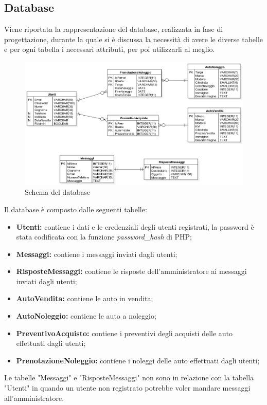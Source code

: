     \subsection{Database}
    Viene riportata la rappresentazione del database, realizzata in fase di progettazione, durante la quale si è discussa la necessità di avere le diverse tabelle e per ogni tabella i necessari attributi, per poi utilizzarli al meglio.
    \begin{figure}[H]
        \centering
        \includegraphics[width=14cm]{./img/database.png}
        \caption{Schema del database}  \label{fig:xray}
    \end{figure}
    Il database è composto dalle seguenti tabelle:
    \begin{itemize}
        \item \textbf{Utenti:} contiene i dati e le credenziali degli utenti registrati, la password è stata codificata con la funzione \textit{password\_hash} di PHP;
        \item \textbf{Messaggi:} contiene i messaggi inviati dagli utenti;
        \item \textbf{RisposteMessaggi:} contiene le risposte dell'amministratore ai messaggi inviati dagli utenti;
        \item \textbf{AutoVendita:} contiene le auto in vendita;
        \item \textbf{AutoNoleggio:} contiene le auto a noleggio;
        \item \textbf{PreventivoAcquisto:} contiene i preventivi degli acquisti delle auto effettuati dagli utenti;
        \item \textbf{PrenotazioneNoleggio:} contiene i noleggi delle auto effettuati dagli utenti;
    \end{itemize}

    Le tabelle "Messaggi" e "RisposteMessaggi" non sono in relazione con la tabella "Utenti" in quando un utente non registrato potrebbe voler mandare messaggi all'amministratore. 
